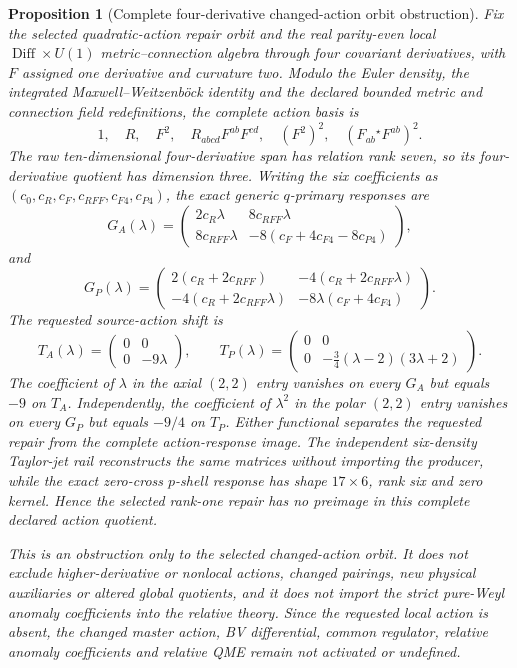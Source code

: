 \documentclass[11pt]{article}
\newtheorem{proposition}[theorem]{Proposition}
\theoremstyle{definition}
\theoremstyle{remark}
\begin{document}
\begin{proposition}[Complete four-derivative changed-action orbit obstruction]
Fix the selected quadratic-action repair orbit and the real parity-even local
$\operatorname{Diff}\times U(1)$ metric--connection algebra through four
covariant derivatives, with $F$ assigned one derivative and curvature two.
Modulo the Euler density, the integrated Maxwell--Weitzenb\"ock identity and
the declared bounded metric and connection field redefinitions, the complete
action basis is
\[
 1,\quad R,\quad F^2,\quad
 R_{abcd}F^{ab}F^{cd},\quad (F^2)^2,\quad
 (F_{ab}{}^\star F^{ab})^2.
\]
The raw ten-dimensional four-derivative span has relation rank seven, so its
four-derivative quotient has dimension three.  Writing the six coefficients
as $(c_0,c_R,c_F,c_{RFF},c_{F4},c_{P4})$, the exact generic $q$-primary
responses are
\[
 G_A(\lambda)=
 \begin{pmatrix}
 2c_R\lambda&8c_{RFF}\lambda\\
 8c_{RFF}\lambda&-8(c_F+4c_{F4}-8c_{P4})
 \end{pmatrix},
\]
and
\[
 G_P(\lambda)=
 \begin{pmatrix}
 2(c_R+2c_{RFF})&-4(c_R+2c_{RFF}\lambda)\\
 -4(c_R+2c_{RFF}\lambda)&-8\lambda(c_F+4c_{F4})
 \end{pmatrix}.
\]
The requested source-action shift is
\[
 T_A(\lambda)=
 \begin{pmatrix}0&0\\0&-9\lambda\end{pmatrix},
 \qquad
 T_P(\lambda)=
 \begin{pmatrix}
 0&0\\0&-\frac34(\lambda-2)(3\lambda+2)
 \end{pmatrix}.
\]
The coefficient of $\lambda$ in the axial $(2,2)$ entry vanishes on every
$G_A$ but equals $-9$ on $T_A$.  Independently, the coefficient of
$\lambda^2$ in the polar $(2,2)$ entry vanishes on every $G_P$ but equals
$-9/4$ on $T_P$.  Either functional separates the requested repair from the
complete action-response image.  The independent six-density Taylor-jet
rail reconstructs the same matrices without importing the producer, while
the exact zero-cross $p$-shell response has shape $17\times6$, rank six and
zero kernel.  Hence the selected rank-one repair has no preimage in this
complete declared action quotient.

This is an obstruction only to the selected changed-action orbit.  It does
not exclude higher-derivative or nonlocal actions, changed pairings, new
physical auxiliaries or altered global quotients, and it does not import the
strict pure-Weyl anomaly coefficients into the relative theory.  Since the
requested local action is absent, the changed master action, BV differential,
common regulator, relative anomaly coefficients and relative QME remain
not activated or undefined.
\end{proposition}
\end{document}
